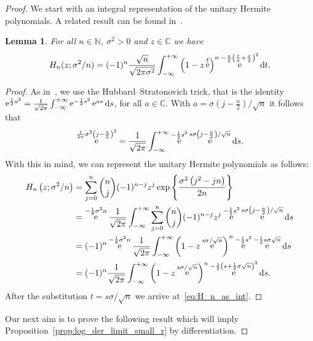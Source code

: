 \documentclass[10pt]{amsart}
\newtheorem{lemm}[theo]{Lemma}\newtheorem{prop}[theo]{Proposition}\newtheorem{coro}[theo]{Corollary}\newtheorem{conj}[theo]{Conjecture}
\theoremstyle{definition}\newtheorem{defi}[theo]{Definition}\newtheorem{rema}[theo]{Remark}\newtheorem{exam}[theo]{Example}\newtheorem{exem}[theo]{Example}\newtheorem{nota}[theo]{Notation}
\DeclareMathOperator{\eee}{e}
\newcommand{\N}{\mathbb{N}}
\newcommand{\C}{\mathbb{C}}
\newcommand*\dint{\text{\normalfont d}}
\begin{document}
\begin{proof}
We start with an integral representation of the unitary Hermite polynomials. A related result can be found in~\cite[Proposition~2.1]{shamis_zeitouni}.

\begin{lemm}\label{lem:hubbard_stratonovich}
For all $n\in \N$, $\sigma^2>0$ and $z\in \C$ we have
\begin{equation}\label{eq:H_n_as_int}
H_n(z;\sigma^2/n) = (-1)^n \frac{\sqrt n}{\sqrt{2\pi \sigma^2}} \int_{-\infty}^{+\infty} \left(1 - z\eee^t\right)^n \eee^{-\frac n2 \left(\frac{t}{\sigma} + \frac \sigma 2\right)^2} \dint t.
\end{equation}
\end{lemm}
\begin{proof}
As in~\cite{shamis_zeitouni}, we use the Hubbard--Stratonovich trick, that is the identity $\eee^{\frac 12 a^2} = \frac 1 {\sqrt {2\pi}} \int_{-\infty}^{+\infty} \eee^{- \frac 1 2 s^2} \eee^{a s}\dint s$, for all $a\in \C$. With $a = \sigma (j-\frac n2)/\sqrt n$ it follows that
\[
\eee^{\frac 1{2n} \sigma^2\left(j- \frac n2\right)^2} =
\frac 1 {\sqrt {2\pi}} \int_{-\infty}^{+\infty} \eee^{- \frac 1 2 s^2} \eee^{s \sigma\left(j-\frac n2\right)/\sqrt n}\dint s.
\]
With this in mind, we can represent the unitary Hermite polynomials as follows:
\begin{align*}
H_n\left(z;\sigma^2/n\right) &=
\sum_{j=0}^n \binom nj (-1)^{n-j} z^j \exp\left\{\frac {\sigma^2 \left(j^2 - jn\right)}{2n}\right\} \\
&=
\eee^{-\frac 18 \sigma^2n} \frac 1 {\sqrt {2\pi}} \int_{-\infty}^{+\infty} \sum_{j=0}^n \binom nj (-1)^{n-j} z^j \eee^{-\frac 12 s^2} \eee^{s \sigma \left(j-\frac n2\right)/\sqrt n}\dint s\\
&= (-1)^n \eee^{-\frac 18 \sigma^2n} \frac {1} {\sqrt {2\pi}} \int_{-\infty}^{+\infty} \left(1 - z\eee^{s \sigma/\sqrt n}\right)^n \eee^{-\frac 12 s^2} \eee^{ - \frac 12 s \sigma \sqrt n}\dint s\\
&= (-1)^n \frac {1} {\sqrt {2\pi}} \int_{-\infty}^{+\infty} \left(1 - z\eee^{s \sigma/\sqrt n}\right)^n \eee^{-\frac 12\left(s + \frac12 \sigma \sqrt n\right)^2} \dint s.
\end{align*}
After the substitution $t=s\sigma/\sqrt n$ we arrive at~\eqref{eq:H_n_as_int}.
\end{proof}



Our next aim is to prove the following result which will imply Proposition~\ref{prop:log_der_limit_small_r} by differentiation.


\end{proof}
\end{document}
